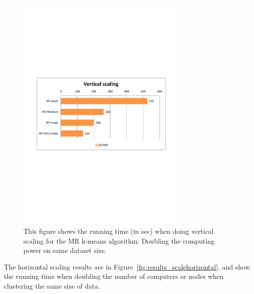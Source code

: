 \begin{figure}[ht]
\centering
\includegraphics[trim = 10mm 90mm 10mm 90mm, clip, width=0.75\textwidth]{Figures/experiments/scale_vertical.pdf}
\caption{This figure shows the running time (in sec) when doing vertical scaling for the MR k-means algorithm. Doubling the computing power on same dataset size.}
\label{fig:results_scalevertical}
\end{figure}

The horizontal scaling results are in Figure~\ref{fig:results_scalehorizontal}, and show the running time when doubling the number of computers or nodes when clustering the same size of data.  


